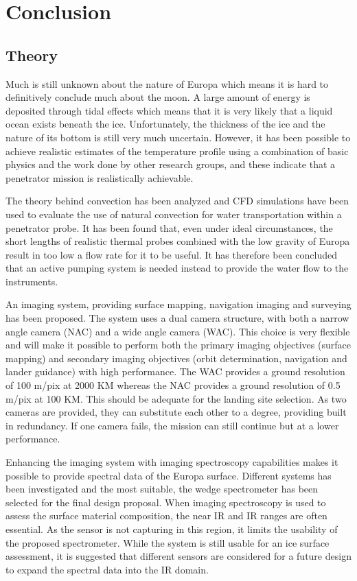 \chapter{Conclusion}
\section{Theory}
Much is still unknown about the nature of Europa which means it is hard to definitively conclude much about the moon. A large amount of energy is deposited through tidal effects which means that it is very likely that a liquid ocean exists beneath the ice. Unfortunately, the thickness of the ice and the nature of its bottom is still very much uncertain. However, it has been possible to achieve realistic estimates of the temperature profile using a combination of basic physics and the work done by other research groups, and these indicate that a penetrator mission is realistically achievable. 

The theory behind convection has been analyzed and CFD simulations have been used to evaluate the use of natural convection for water transportation within a penetrator probe. It has been found that, even under ideal circumstances, the short lengths of realistic thermal probes combined with the low gravity of Europa result in too low a flow rate for it to be useful. It has therefore been concluded that an active pumping system is needed instead to provide the water flow to the instruments.

An imaging system, providing surface mapping, navigation imaging and surveying has been proposed. The system uses a dual camera structure, with both a narrow angle camera (NAC) and a wide angle camera (WAC). This choice is very flexible and will make it possible to perform both the primary imaging objectives (surface mapping) and secondary imaging objectives (orbit determination, navigation and lander guidance) with high performance. The WAC provides a ground resolution of 100 m/pix at 2000 KM whereas the NAC provides a ground resolution of 0.5 m/pix at 100 KM. This should be adequate for the landing site selection. As two cameras are provided, they can substitute each other to a degree, providing built in redundancy. If one camera fails, the mission can still continue but at a lower performance.

Enhancing the imaging system with imaging spectroscopy capabilities makes it possible to provide spectral data of the Europa surface. Different systems has been investigated and the most suitable, the wedge spectrometer has been selected for the final design proposal. When imaging spectroscopy is used to assess the surface material composition, the near IR and IR ranges are often essential. As the sensor is not capturing in this region, it limits the usability of the proposed spectrometer. While the system is still usable for an ice surface assessment, it is suggested that different sensors are considered for a future design to expand the spectral data into the IR domain.

